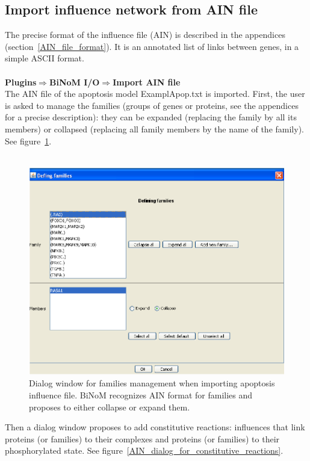 \subsection{Import influence network from AIN file} \label{Import_AIN_file}
The precise format of the influence file (AIN) is described in the appendices (section~\ref{AIN_file_format}). It is an annotated list of links between genes, in a simple ASCII format.\\\\
\textbf{Plugins$\Rightarrow$BiNoM I/O$\Rightarrow$Import AIN file}\\
The AIN file of the apoptosis model ExamplApop.txt is imported. First, the user is asked to manage the families (groups of genes or proteins, see the appendices for a precise description): they can be expanded (replacing the family by all its members) or collapsed (replacing all family members by the name of the family). See figure~\ref{AIN_dialog_for_families_management}.\\\\
\begin{figure}
\centering
\includegraphics[width=14 cm]{graphics/AIN_dialog_for_families_management}
\caption{Dialog window for families management when importing apoptosis influence file. BiNoM recognizes AIN format for families and proposes to either collapse or expand them.}
\label{AIN_dialog_for_families_management}
\end{figure}
Then a dialog window proposes to add constitutive reactions: influences that link proteins (or families) to their complexes and proteins (or families) to their phosphorylated state. See figure~\ref{AIN_dialog_for_constitutive_reactions}.\\\\
